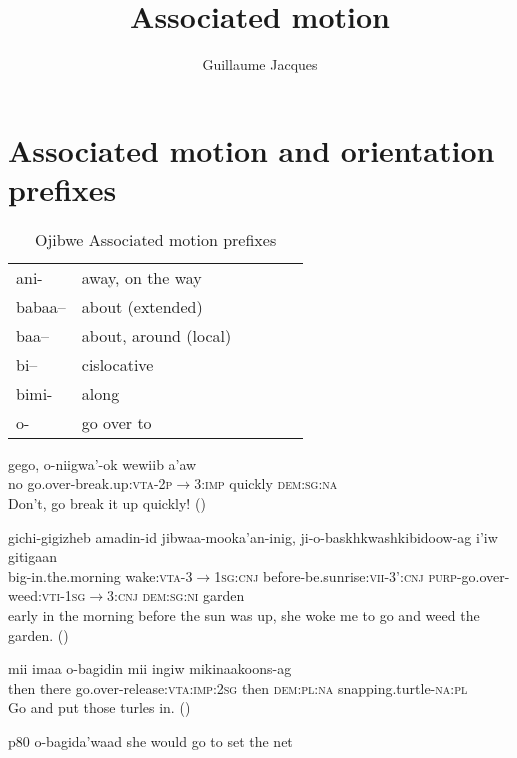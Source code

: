 \documentclass[oldfontcommands,oneside,a4paper,11pt]{article}
\begin{document}
 
 \title{Associated motion} 
\author{Guillaume Jacques}
\maketitle
\linenumbers
\sloppy


\section{Associated motion and orientation prefixes}
\citet[728-734]{valentine01grammar}


\begin{table}[H]
\caption{Ojibwe Associated motion prefixes }\label{tab:ojb.am} \centering
\begin{tabular}{llllll}
\toprule
ani- &away, on the way\\
babaa--&about (extended)\\
baa-- &about, around (local)\\
bi--	&cislocative\\
bimi- &along\\
o- &go over to\\
\bottomrule
\end{tabular}
\end{table}

\citet{kegg93portage}

\begin{exe}
\ex 
\gll
gego, o-niigwa'-ok wewiib a'aw \\
no go.over-break.up:\textsc{vta}-\textsc{2p$\rightarrow$3:imp} quickly \textsc{dem:sg:na} \\
\glt Don't, go break it up quickly! (\citealt[150]{kegg93portage})
\end{exe}

\begin{exe}
\ex 
\gll
gichi-gigizheb amadin-id jibwaa-mooka'an-inig, ji-o-baskhkwashkibidoow-ag i'iw gitigaan \\
big-in.the.morning wake:\textsc{vta}-3$\rightarrow$\textsc{1sg}:\textsc{cnj} before-be.sunrise:\textsc{vii}-3':\textsc{cnj}
\textsc{purp}-go.over-weed:\textsc{vti}-\textsc{1sg}$\rightarrow$3:\textsc{cnj} \textsc{dem:sg:ni} garden \\
\glt early in the morning before the sun was up, she woke me to go and weed the garden. (\citealt[42]{kegg93portage})
\end{exe}

\begin{exe}
\ex 
\gll
mii imaa o-bagidin mii ingiw mikinaakoons-ag \\
then there go.over-release:\textsc{vta}:\textsc{imp:2sg} then \textsc{dem:pl:na} snapping.turtle-\textsc{na:pl} \\
\glt Go and put those turles in. (\citealt[51]{kegg93portage})
\end{exe}
p80 o-bagida'waad she would go to set the net
\end{document}
